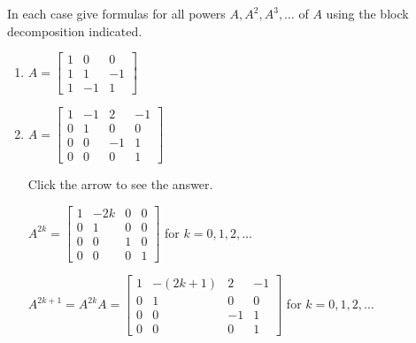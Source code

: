 \documentclass{ximera}
\begin{document}
\begin{problem}\label{prob:block_powers}
In each case give formulas for all powers $A, A^{2}, A^{3}, \dots$ of $A$ using the block decomposition indicated.


\begin{enumerate}
\item
$A = \left[ \begin{array}{r|rr}
1 & 0 & 0 \\
\hline
1 & 1  & -1\\
1 & -1 & 1
\end{array} \right]
$


\item
$A = \left[ \begin{array}{rr|rr}
1 & -1 & 2 & -1 \\
0 & 1 & 0 & 0 \\
\hline
0 & 0 & -1 & 1 \\
0 & 0 & 0 & 1
\end{array} \right]
$

Click the arrow to see the answer.
\begin{expandable}
$
A^{2k} = \left[ \begin{array}{rc|rr}
1 & -2k & 0 & 0 \\
0 & 1 & 0 & 0 \\
\hline
0 & 0 & 1 & 0 \\
0 & 0 & 0 & 1
\end{array} \right]$ for $k = 0, 1, 2, \dots$

$A^{2k + 1} = A^{2k}A = \left[ \begin{array}{rc|rr}
1 & -(2k + 1) & 2 & -1 \\
0 & 1 & 0 & 0 \\
\hline
0 & 0 & -1 & 1 \\
0 & 0 & 0 & 1
\end{array} \right]$ for $k = 0, 1, 2, \dots$
\end{expandable}
\end{enumerate}
\end{problem}
\end{document}
